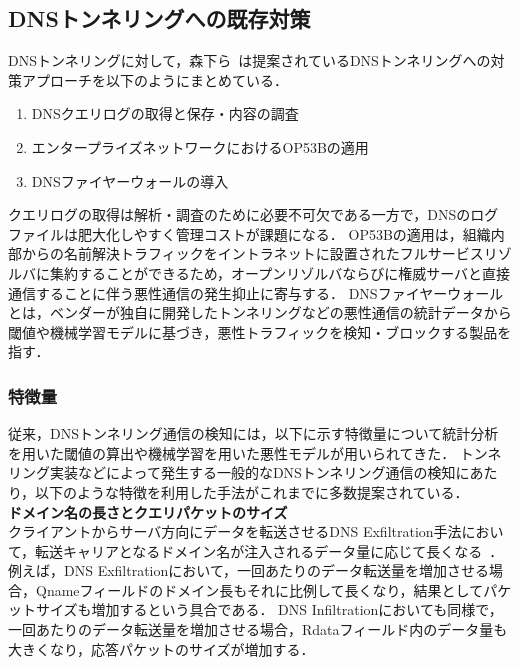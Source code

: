 
\subsection{DNSトンネリングへの既存対策}
DNSトンネリングに対して，森下ら~\cite{morishita}は提案されているDNSトンネリングへの対策アプローチを以下のようにまとめている．
\begin{enumerate}
 \item DNSクエリログの取得と保存・内容の調査
 \vspace{-0.3cm}
 \item エンタープライズネットワークにおけるOP53Bの適用
 \vspace{-0.3cm}
 \item DNSファイヤーウォールの導入
\end{enumerate}
クエリログの取得は解析・調査のために必要不可欠である一方で，DNSのログファイルは肥大化しやすく管理コストが課題になる．
OP53Bの適用は，組織内部からの名前解決トラフィックをイントラネットに設置されたフルサービスリゾルバに集約することができるため，オープンリゾルバならびに権威サーバと直接通信することに伴う悪性通信の発生抑止に寄与する．
DNSファイヤーウォールとは，ベンダーが独自に開発したトンネリングなどの悪性通信の統計データから閾値や機械学習モデルに基づき，悪性トラフィックを検知・ブロックする製品を指す．

\subsubsection{特徴量}
\label{sec:pre-tunnel-feature}
従来，DNSトンネリング通信の検知には，以下に示す特徴量について統計分析を用いた閾値の算出や機械学習を用いた悪性モデルが用いられてきた．
トンネリング実装などによって発生する一般的なDNSトンネリング通信の検知にあたり，以下のような特徴を利用した手法がこれまでに多数提案されている．\\

\hspace{-12pt}\textbf{ドメイン名の長さとクエリパケットのサイズ}\\
\hspace{12pt}クライアントからサーバ方向にデータを転送させるDNS Exfiltration手法において，転送キャリアとなるドメイン名が注入されるデータ量に応じて長くなる~\cite{vern}．
例えば，DNS Exfiltrationにおいて，一回あたりのデータ転送量を増加させる場合，Qnameフィールドのドメイン長もそれに比例して長くなり，結果としてパケットサイズも増加するという具合である．
DNS Infiltrationにおいても同様で，一回あたりのデータ転送量を増加させる場合，Rdataフィールド内のデータ量も大きくなり，応答パケットのサイズが増加する．\\

